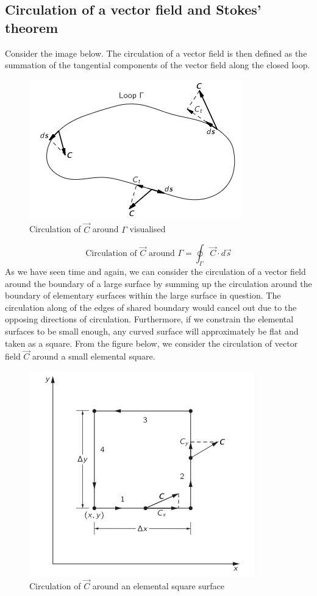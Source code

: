 \subsection{Circulation of a vector field and Stokes' theorem}
Consider the image below. The circulation of a vector field is then defined as the summation of the tangential components of the vector field along the closed loop. 
\begin{figure}[H]
    \centering
    \includegraphics[scale = 0.6]{math prelim/images_math prelim/circulation}
    \caption{Circulation of $\vec{C}$ around $\Gamma$ visualised}
    \label{circ pic}
\end{figure}
\begin{equation}
	\text{Circulation of $\vec{C}$ around $\Gamma$} = \oint_{\Gamma} \vec{C} \cdot d\vec{s}
\end{equation}
As we have seen time and again, we can consider the circulation of a vector field around the boundary of a large surface by summing up the circulation around the boundary of elementary surfaces within the large surface in question. The circulation along of the edges of shared boundary would cancel out due to the opposing directions of circulation. Furthermore, if we constrain the elemental surfaces to be small enough, any curved surface will approximately be flat and taken as a square. From the figure below, we consider the circulation of vector field $\vec{C}$ around a small elemental square. 
\begin{figure}[H]
    \centering
    \includegraphics[scale = 0.6]{math prelim/images_math prelim/surface}
    \caption{Circulation of $\vec{C}$ around an elemental square surface}
    \label{stokes pic}
\end{figure}
